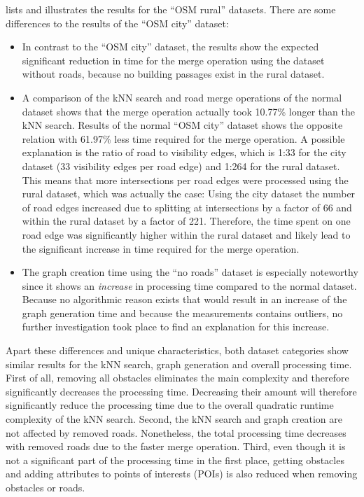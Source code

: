 			\noindent
			 lists and illustrates the results for the \enquote{OSM rural} datasets.
			There are some differences to the results of the \enquote{OSM city} dataset:
			\begin{itemize}
				\item In contrast to the \enquote{OSM city} dataset, the results show the expected significant reduction in time for the merge operation using the dataset without roads, because no building passages exist in the rural dataset.
				\item A comparison of the kNN search and road merge operations of the normal dataset shows that the merge operation actually took 10.77\% longer than the kNN search.
				Results of the normal \enquote{OSM city} dataset shows the opposite relation with 61.97\% less time required for the merge operation.
				A possible explanation is the ratio of road to visibility edges, which is 1:33 for the city dataset (33 visibility edges per road edge) and 1:264 for the rural dataset.
				This means that more intersections per road edges were processed using the rural dataset, which was actually the case:
				Using the city dataset the number of road edges increased due to splitting at intersections by a factor of 66 and within the rural dataset by a factor of 221.
				Therefore, the time spent on one road edge was significantly higher within the rural dataset and likely lead to the significant increase in time required for the merge operation.
				\item The graph creation time using the \enquote{no roads} dataset is especially noteworthy since it shows an \emph{increase} in processing time compared to the normal dataset.
				Because no algorithmic reason exists that would result in an increase of the graph generation time and because the measurements contains outliers, no further investigation took place to find an explanation for this increase.
			\end{itemize}
			Apart these differences and unique characteristics, both dataset categories show similar results for the kNN search, graph generation and overall processing time.
			First of all, removing all obstacles eliminates the main complexity and therefore significantly decreases the processing time.
			Decreasing their amount will therefore significantly reduce the processing time due to the overall quadratic runtime complexity of the kNN search.
			Second, the kNN search and graph creation are not affected by removed roads.
			Nonetheless, the total processing time decreases with removed roads due to the faster merge operation.
			Third, even though it is not a significant part of the processing time in the first place, getting obstacles and adding attributes to points of interests (POIs) is also reduced when removing obstacles or roads.
	
